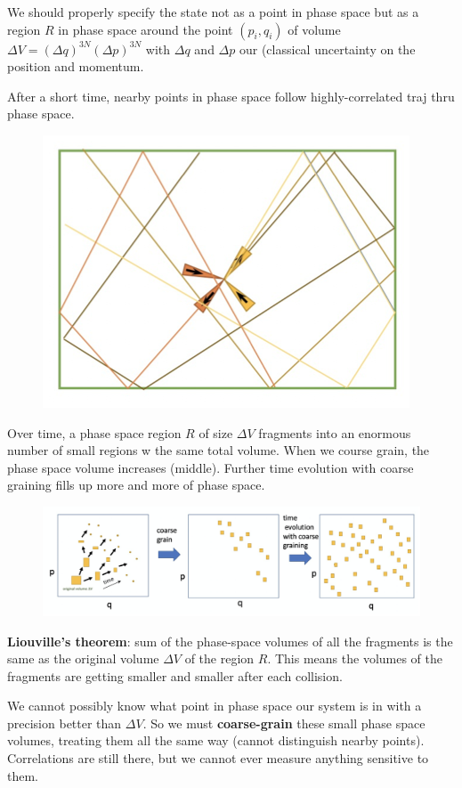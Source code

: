 We should properly specify the state not as a point in phase space but as a region $R$ in phase space around the point $(p_i, q_i)$ of volume $\Delta V = (\Delta q)^{3N} (\Delta p)^{3N}$ with $\Delta q$ and $\Delta p$ our (classical uncertainty on the position and momentum.

After a short time, nearby points in phase space follow highly-correlated traj thru phase space.

\begin{figure}[h]
    \centering
    \includegraphics[width=0.5\linewidth]{figures/03_04.png}
\end{figure}

Over time, a phase space region $R$ of size $\Delta V$ fragments into an enormous number of small regions w the same total volume. When we course grain, the phase space volume increases (middle). Further time evolution with coarse graining fills up more and more of phase space.

\begin{figure}[h]
    \centering
    \includegraphics[width=1\linewidth]{figures/03_05.png}
\end{figure}

\textbf{Liouville's theorem}: sum of the phase-space volumes of all the fragments is the same as the original volume $\Delta V$ of the region $R$. This means the volumes of the fragments are getting smaller and smaller after each collision. 

We cannot possibly know what point in phase space our system is in with a precision better than $\Delta V$. So we must \textbf{coarse-grain} these small phase space volumes, treating them all the same way (cannot distinguish nearby points). Correlations are still there, but we cannot ever measure anything sensitive to them.

